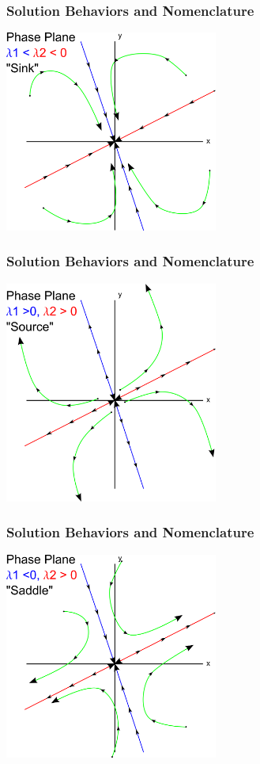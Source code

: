 \begin{frame}
  \frametitle{Solution Behaviors and Nomenclature}

 \includegraphics[width=7cm]{img/phasePlaneSink}
 
\end{frame}

\begin{frame}
  \frametitle{Solution Behaviors and Nomenclature}
    \includegraphics[width=7cm]{img/phasePlaneSource}
\end{frame}

\begin{frame}
  \frametitle{Solution Behaviors and Nomenclature}
    \includegraphics[width=7cm]{img/phasePlaneSaddle}
\end{frame}


